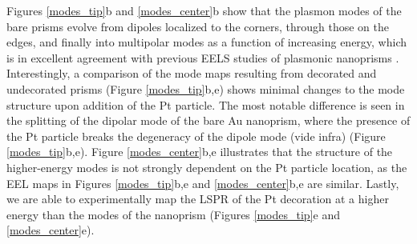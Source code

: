 \documentclass [11pt, proquest] {uwthesis}[2016/11/22]
\begin{document}
Figures \ref{modes_tip}b and \ref{modes_center}b show that the plasmon modes of the bare prisms evolve from dipoles localized to the corners, through those on the edges, and finally into multipolar modes as a function of increasing energy, which is in excellent agreement with previous EELS studies of plasmonic nanoprisms \cite{ColliexMapping,ColliexEELS}. Interestingly, a comparison of the mode maps resulting from decorated and undecorated prisms (Figure \ref{modes_tip}b,e) shows minimal changes to the mode structure upon addition of the Pt particle. The most notable difference is seen in the splitting of the dipolar mode of the bare Au nanoprism, where the presence of the Pt particle breaks the degeneracy of the dipole mode (vide infra) (Figure \ref{modes_tip}b,e). Figure \ref{modes_center}b,e illustrates that the structure of the higher-energy modes is not strongly dependent on the Pt particle location, as the EEL maps in Figures \ref{modes_tip}b,e and \ref{modes_center}b,e are similar. Lastly, we are able to experimentally map the LSPR of the Pt decoration at a higher energy than the modes of the nanoprism (Figures \ref{modes_tip}e and \ref{modes_center}e).
\end{document}
